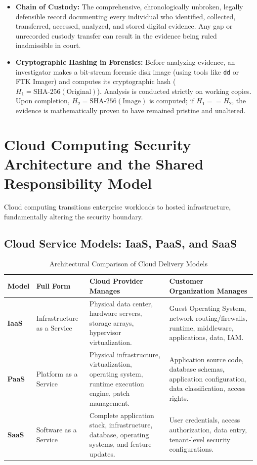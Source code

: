 \begin{itemize}
\item \textbf{Chain of Custody:} The comprehensive, chronologically unbroken, legally defensible record documenting every individual who identified, collected, transferred, accessed, analyzed, and stored digital evidence. Any gap or unrecorded custody transfer can result in the evidence being ruled inadmissible in court.
\item \textbf{Cryptographic Hashing in Forensics:} Before analyzing evidence, an investigator makes a bit-stream forensic disk image (using tools like \texttt{dd} or FTK Imager) and computes its cryptographic hash ($H_1 = \text{SHA-256}(\text{Original})$). Analysis is conducted strictly on working copies. Upon completion, $H_2 = \text{SHA-256}(\text{Image})$ is computed; if $H_1 == H_2$, the evidence is mathematically proven to have remained pristine and unaltered.
\end{itemize}

\newpage
\section{Cloud Computing Security Architecture and the Shared Responsibility Model}

Cloud computing transitions enterprise workloads to hosted infrastructure, fundamentally altering the security boundary.

\subsection{Cloud Service Models: IaaS, PaaS, and SaaS}

\begin{table}[htbp]
\centering
\caption{Architectural Comparison of Cloud Delivery Models}
\label{tab:cloud_models}
\begin{tabularx}{\textwidth}{p{2.2cm} p{3.2cm} X X}
\toprule
\textbf{Model} & \textbf{Full Form} & \textbf{Cloud Provider Manages} & \textbf{Customer Organization Manages} \\
\midrule
\textbf{IaaS} & Infrastructure as a Service & Physical data center, hardware servers, storage arrays, hypervisor virtualization. & Guest Operating System, network routing/firewalls, runtime, middleware, applications, data, IAM. \\
\textbf{PaaS} & Platform as a Service & Physical infrastructure, virtualization, operating system, runtime execution engine, patch management. & Application source code, database schemas, application configuration, data classification, access rights. \\
\textbf{SaaS} & Software as a Service & Complete application stack, infrastructure, database, operating systems, and feature updates. & User credentials, access authorization, data entry, tenant-level security configurations. \\
\bottomrule
\end{tabularx}
\end{table}


